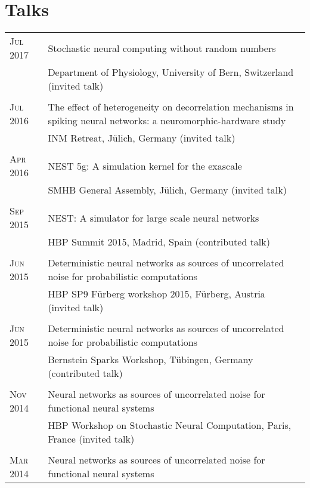 \documentclass[a4paper,10pt]{article}
\begin{document}
\section{Talks}
\begin{longtable}{>{\hfill}p{1.6cm}|p{}}
  \textsc{Jul} 2017 & Stochastic neural computing without random numbers \\
  & \footnotesize Department of Physiology, University of Bern, Switzerland (invited talk)\\
  \multicolumn{2}{c}{} \\
  \textsc{Jul} 2016 & The effect of heterogeneity on decorrelation mechanisms in spiking neural networks: a neuromorphic-hardware study \\
  & \footnotesize INM Retreat, J\"ulich, Germany (invited talk)\\
  \multicolumn{2}{c}{} \\
  \textsc{Apr} 2016 & NEST 5g: A simulation kernel for the exascale \\
  & \footnotesize SMHB General Assembly, J\"ulich, Germany (invited talk)\\
  \multicolumn{2}{c}{} \\
  \textsc{Sep} 2015 & NEST: A simulator for large scale neural networks\\
  & \footnotesize HBP Summit 2015, Madrid, Spain (contributed talk)\\
  \multicolumn{2}{c}{} \\
  \textsc{Jun} 2015 & Deterministic neural networks as sources of uncorrelated noise for probabilistic computations\\
  & \footnotesize HBP SP9 F\"urberg workshop 2015, F\"urberg, Austria (invited talk)\\
  \multicolumn{2}{c}{} \\
  \textsc{Jun} 2015 & Deterministic neural networks as sources of uncorrelated noise for probabilistic computations \\
  & \footnotesize Bernstein Sparks Workshop, T\"ubingen, Germany (contributed talk)\\
  \multicolumn{2}{c}{} \\
  \textsc{Nov} 2014 & Neural networks as sources of uncorrelated noise for functional neural systems \\
  & \footnotesize HBP Workshop on Stochastic Neural Computation, Paris, France (invited talk)\\
  \multicolumn{2}{c}{} \\
  \textsc{Mar} 2014 & Neural networks as sources of uncorrelated noise for functional neural systems \\

\end{longtable}
\end{document}
